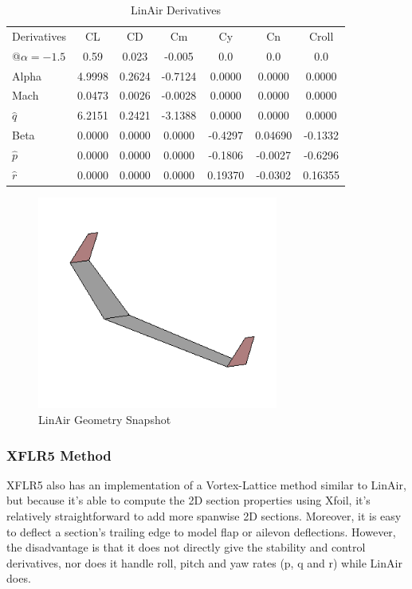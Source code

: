\documentclass[titlepage,10pt]{article}
\begin{document}
\begin{table}[h]
\begin{center}
\begin{tabular}{|l | c | c | c| c| c| c|}
\hline
Derivatives	&CL&      		CD      	&Cm      	&Cy    &  	Cn      &	Croll   \\
@$\alpha=-1.5$	&0.59			&0.023          &-0.005         &0.0    &       0.0     &   0.0 \\
\hline
Alpha   	&4.9998&		0.2624&		-0.7124&	0.0000&		0.0000&		0.0000\\
Mach    	&0.0473&		0.0026&		-0.0028&	0.0000&		0.0000&		0.0000\\
$\hat{q} $  	&6.2151&		0.2421&		-3.1388&	0.0000&		0.0000&		0.0000\\
\hline
Beta    	&0.0000&		0.0000&		0.0000&		-0.4297&	0.04690&	-0.1332\\
$\hat{p}$   	&0.0000&		0.0000&		0.0000&		-0.1806&	-0.0027&	-0.6296\\
$\hat{r}  $ 	&0.0000&		0.0000&		0.0000&		0.19370&	-0.0302&	0.16355\\
\hline
\end{tabular}
\end{center}
\caption{LinAir Derivatives}
\end{table}

\begin{figure}[hb]
\begin{center}
\includegraphics[height = 70mm]{LinAir.png}
\end{center}
\caption{LinAir Geometry Snapshot}
\label{linair}
\end{figure}
\clearpage

\subsubsection{XFLR5 Method}
XFLR5 also has an implementation of a Vortex-Lattice method similar to LinAir, but because it's able to compute the 2D section properties using Xfoil, it's relatively straightforward to add more spanwise 2D sections. Moreover, it is easy to deflect a section's trailing edge to model flap or ailevon deflections. However, the disadvantage is that it does not directly give the stability and control derivatives, nor does it handle roll, pitch and yaw rates (p, q and r) while LinAir does.\\
\end{document}

